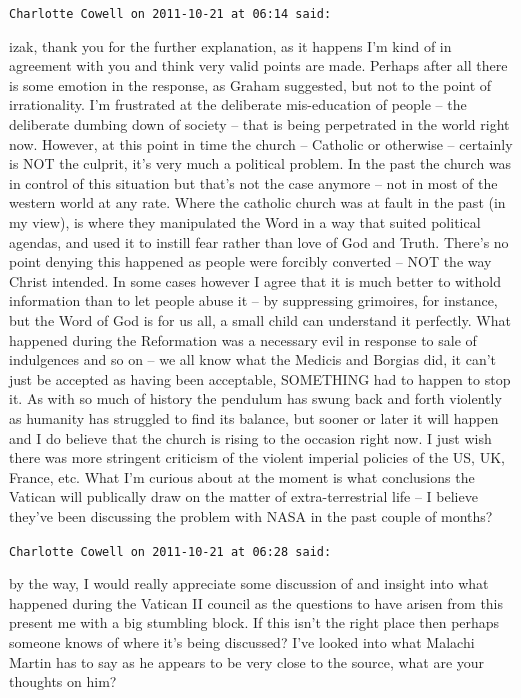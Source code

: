 \begin{footnotesize}
\begin{sffamily}
\texttt{Charlotte Cowell on 2011-10-21 at 06:14 said:}

izak, thank you for the further explanation, as it happens I'm kind of in agreement with you and think very valid points are made. Perhaps after all there is some emotion in the response, as Graham suggested, but not to the point of irrationality. I'm frustrated at the deliberate mis-education of people -- the deliberate dumbing down of society -- that is being perpetrated in the world right now. However, at this point in time the church -- Catholic or otherwise -- certainly is NOT the culprit, it's very much a political problem. In the past the church was in control of this situation but that's not the case anymore -- not in most of the western world at any rate. Where the catholic church was at fault in the past (in my view), is where they manipulated the Word in a way that suited political agendas, and used it to instill fear rather than love of God and Truth. There's no point denying this happened as people were forcibly converted -- NOT the way Christ intended. In some cases however I agree that it is much better to withold information than to let people abuse it -- by suppressing grimoires, for instance, but the Word of God is for us all, a small child can understand it perfectly. What happened during the Reformation was a necessary evil in response to sale of indulgences and so on -- we all know what the Medicis and Borgias did, it can't just be accepted as having been acceptable, SOMETHING had to happen to stop it. As with so much of history the pendulum has swung back and forth violently as humanity has struggled to find its balance, but sooner or later it will happen and I do believe that the church is rising to the occasion right now. I just wish there was more stringent criticism of the violent imperial policies of the US, UK, France, etc. What I'm curious about at the moment is what conclusions the Vatican will publically draw on the matter of extra-terrestrial life -- I believe they've been discussing the problem with NASA in the past couple of months?

\hfill

\texttt{Charlotte Cowell on 2011-10-21 at 06:28 said:}

by the way, I would really appreciate some discussion of and insight into what happened during the Vatican II council as the questions to have arisen from this present me with a big stumbling block. If this isn't the right place then perhaps someone knows of where it's being discussed? I've looked into what Malachi Martin has to say as he appears to be very close to the source, what are your thoughts on him?


\end{sffamily}
\end{footnotesize}
